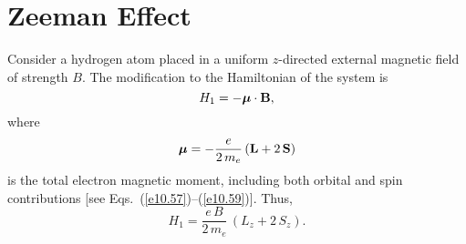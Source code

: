 \section{Zeeman Effect}
Consider a hydrogen atom placed in a uniform $z$-directed external
magnetic field of strength $B$. The modification to the Hamiltonian
of the system is
\begin{equation}
H_1 = -\mbox{\boldmath$\mu$}\cdot{\bf B},
\end{equation}
where
\begin{equation}
\mbox{\boldmath$\mu$} = - \frac{e}{2\,m_e}\,({\bf L} + 2\,{\bf S})
\end{equation}
is the total electron magnetic moment, including both orbital and spin contributions
[see Eqs.~(\ref{e10.57})--(\ref{e10.59})].  Thus,
\begin{equation}
H_1 = \frac{e\,B}{2\,m_e}\,(L_z+ 2\,S_z).
\end{equation}

